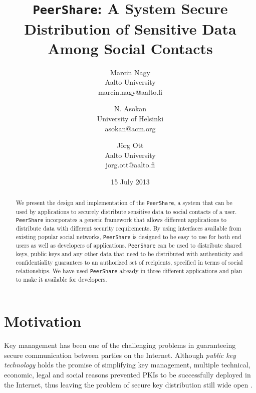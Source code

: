 \documentclass[twocolumn,a4paper,10pt]{article}
\newcommand{\peershare}{\texttt{PeerShare}\xspace}
\begin{document}
\title{\peershare: A System Secure Distribution of Sensitive Data Among Social Contacts}
\author{Marcin Nagy \\Aalto University     \\marcin.nagy@aalto.fi
  \and N. Asokan \\University of Helsinki \\ asokan@acm.org
  \and J\"org Ott   \\Aalto University     \\jorg.ott@aalto.fi
}
\date{15 July 2013}
\maketitle
\begin{abstract}
We present the design and implementation of the \peershare, a system that can be used by applications to securely distribute sensitive data to social contacts of a user.  \peershare incorporates a generic framework that allows different applications to distribute data with different security requirements.  By using interfaces available from existing popular social networks, \peershare is designed to be easy to use for both end users as well as developers of applications. 
\peershare can be used to distribute shared keys, public keys and any other data that need to be distributed with authenticity and confidentiality guarantees to an authorized set of recipients, specified in terms of social relationships.
We have used \peershare already in three different applications and plan to make it available for developers.
\end{abstract}

\section{Motivation}
\label{:motivation}
Key management has been one of the challenging problems in guaranteeing  secure communication between parties on the Internet. Although \emph{public key technology} holds the promise of simplifying key management, multiple technical, economic, legal and social reasons prevented PKIs to be successfully deployed in the Internet, thus leaving the problem of secure key distribution still wide open \cite{DBLP:journals/computer/Gutmann02}.
\end{document}
